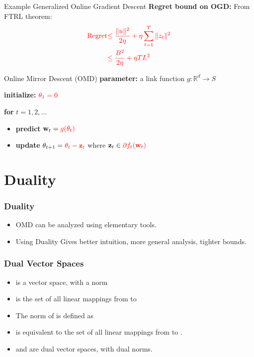 \documentclass[handout]{beamer}
\begin{document}
\begin{small}
\begin{frame}{Example Generalized Online Gradient Descent}
{\bf Regret bound on OGD:} From FTRL theorem:
\begin{align*}
\textcolor{red}{\text{Regret}} &\textcolor{red}{\leq \frac{\|u\|^2}{2\eta} + \eta \sum_{t=1}^T \|z_t\|^2} \\
&\textcolor{red}{\leq \frac{B^2}{2\eta} + \eta T L^2}
\end{align*}
\end{frame}


\begin{frame}{Online Mirror Descent (OMD)}
\textbf{parameter:} a link function \( g : \mathbb{R}^d \to S \)

\textbf{initialize:} \( \textcolor{mathcolor}{\theta_1 = 0} \)

\textbf{for} \( t = 1,2,\dots \)
\begin{itemize}
    \item \textbf{predict} \( \mathbf{w}_t = \textcolor{mathcolor}{ g(\theta_t) } \)
    \item \textbf{update} \( \theta_{t+1} = \textcolor{mathcolor}{ \theta_t - \mathbf{z}_t } \) where \( \mathbf{z}_t \in \textcolor{mathcolor}{ \partial f_t(\mathbf{w}_t) } \)
\end{itemize}
\end{frame}




\section{Duality}

\begin{frame}
  \frametitle{Duality}
  \begin{itemize}
  \item OMD can be analyzed using elementary tools.
    \item Using Duality Gives better intuition, more general analysis, tighter bounds.
  \end{itemize}
\end{frame}

\begin{frame}
\frametitle{Dual Vector Spaces}

\begin{itemize}
\item {} is a vector space, with a norm 
\item {} is the set of all linear mappings from  to
  \item
  The norm of  is defined as
\item {} is equivalent to the set of all linear mappings from  to
  .
\item {} and  are dual vector spaces, with dual norms. 
\end{itemize}
\end{frame}


\end{small}
\end{document}
